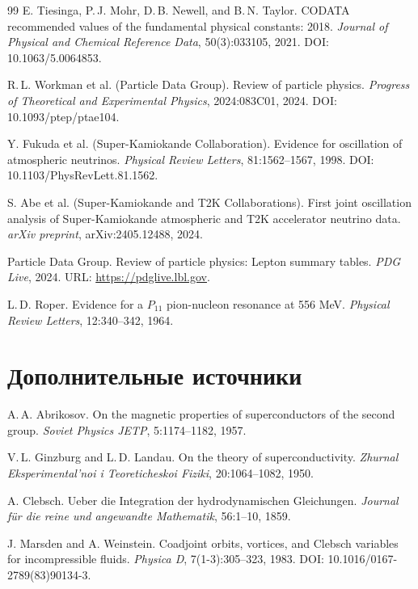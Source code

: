 \documentclass[12pt,a4paper]{article}
\begin{document}
\begin{thebibliography}{99}
	E. Tiesinga, P.\,J. Mohr, D.\,B. Newell, and B.\,N. Taylor.
	\newblock CODATA recommended values of the fundamental physical constants: 2018.
	\newblock \textit{Journal of Physical and Chemical Reference Data}, 50(3):033105, 2021.
	\newblock DOI: 10.1063/5.0064853.
	
	R.\,L. Workman et al. (Particle Data Group).
	\newblock Review of particle physics.
	\newblock \textit{Progress of Theoretical and Experimental Physics}, 2024:083C01, 2024.
	\newblock DOI: 10.1093/ptep/ptae104.
	
	Y. Fukuda et al. (Super-Kamiokande Collaboration).
	\newblock Evidence for oscillation of atmospheric neutrinos.
	\newblock \textit{Physical Review Letters}, 81:1562--1567, 1998.
	\newblock DOI: 10.1103/PhysRevLett.81.1562.
	
	S. Abe et al. (Super-Kamiokande and T2K Collaborations).
	\newblock First joint oscillation analysis of Super-Kamiokande atmospheric and T2K accelerator neutrino data.
	\newblock \textit{arXiv preprint}, arXiv:2405.12488, 2024.
	
	Particle Data Group.
	 Review of particle physics: Lepton summary tables.
	\newblock \textit{PDG Live}, 2024.
	\newblock URL: \url{https://pdglive.lbl.gov}.
	
	L.\,D. Roper.
	\newblock Evidence for a $P_{11}$ pion-nucleon resonance at 556 MeV.
	\newblock \textit{Physical Review Letters}, 12:340--342, 1964.
	
	\section*{Дополнительные источники}
	
	A.\,A. Abrikosov.
	\newblock On the magnetic properties of superconductors of the second group.
	\newblock \textit{Soviet Physics JETP}, 5:1174--1182, 1957.
	
	V.\,L. Ginzburg and L.\,D. Landau.
	\newblock On the theory of superconductivity.
	\newblock \textit{Zhurnal Eksperimental'noi i Teoreticheskoi Fiziki}, 20:1064--1082, 1950.
	
	A. Clebsch.
	\newblock Ueber die Integration der hydrodynamischen Gleichungen.
	\newblock \textit{Journal für die reine und angewandte Mathematik}, 56:1--10, 1859.
	
	J. Marsden and A. Weinstein.
	\newblock Coadjoint orbits, vortices, and Clebsch variables for incompressible fluids.
	\newblock \textit{Physica D}, 7(1-3):305--323, 1983.
	\newblock DOI: 10.1016/0167-2789(83)90134-3.
	

\end{thebibliography}
\end{document}
